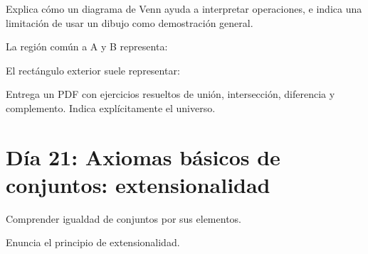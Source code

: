 \begin{activity}[id=dia-20-desarrollo-02,type=long,weight=2]

Explica cómo un diagrama de Venn ayuda a interpretar operaciones, e indica una limitación de usar un dibujo como demostración general.

\end{activity}

\begin{activity}[id=dia-20-opcion-01,type=choice,weight=1]

La región común a A y B representa:





\end{activity}

\begin{activity}[id=dia-20-opcion-02,type=choice,weight=1]

El rectángulo exterior suele representar:





\end{activity}

\begin{deliverable}[id=entrega-dia-20,type=upload,weight=3]

Entrega un PDF con ejercicios resueltos de unión, intersección, diferencia y complemento. Indica explícitamente el universo.

\end{deliverable}

\section{Día 21: Axiomas básicos de conjuntos: extensionalidad}

\begin{lesson}[id=dia-21-lectura,weight=0]

Comprender igualdad de conjuntos por sus elementos.

\end{lesson}

\begin{activity}[id=dia-21-corta-01,type=short,weight=1]

Enuncia el principio de extensionalidad.

\end{activity}

